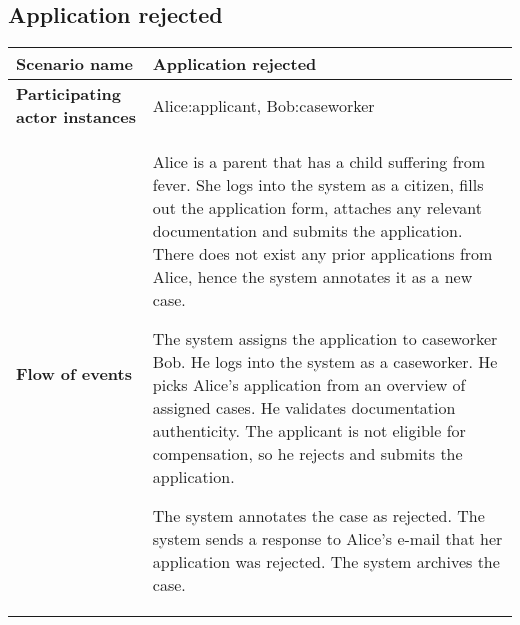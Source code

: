 \subsection*{Application rejected}
\begin{table}[htb!]
\begin{tabularx}{\textwidth}{l|X}
	\textbf{Scenario name} & Application rejected \\
	\hline
	\textbf{Participating actor instances} & Alice:applicant, Bob:caseworker\\
	\hline
	\textbf{Flow of events} &
	\begin{compactenum}
	       \item Alice is a parent that has a child suffering from fever. She logs into the system as a citizen, fills out the application form, attaches any relevant documentation and submits the application. There does not exist any prior applications from Alice, hence the system annotates it as a new case.
           \item  The system assigns the application to caseworker Bob. He logs into the system as a caseworker. He picks Alice's application from an overview of assigned cases. He validates documentation authenticity. The applicant is not eligible for compensation, so he rejects and submits the application.
	        \item The system annotates the case as rejected. The system sends a response to Alice's e-mail that her application was rejected. The system archives the case.
	\end{compactenum}\\
	\hline
\end{tabularx}
\end{table}

\newpage
